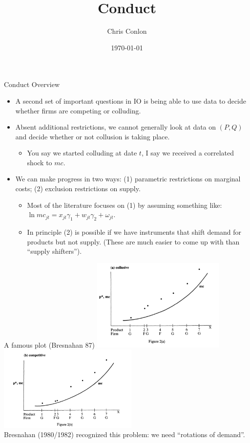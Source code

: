 \documentclass[xcolor=pdftex,dvipsnames,table,mathserif,aspectratio=169]{beamer}
\begin{document}
\title{Conduct}
\author{Chris Conlon}
\date{\today}

\frame{\titlepage}

\begin{frame}{Conduct Overview}
\begin{itemize}
\item A second set of important questions in IO is being able to use data to decide whether firms are \alert{competing} or \alert{colluding}.
\item Absent additional restrictions, we cannot generally look at data on $(P,Q)$ and decide whether or not collusion is taking place.
\begin{itemize}
\item You say we started colluding at date $t$, I say we received a correlated shock to $mc$.
\end{itemize}
\item We can make progress in two ways: (1) parametric restrictions on marginal costs; (2) exclusion restrictions on supply.
\begin{itemize}
\item Most of the literature focuses on (1) by assuming something like: $\ln mc_{jt} = x_{jt} \gamma_1 + w_{jt} \gamma_2 + \omega_{jt}$.
\item In principle (2) is possible if we have instruments that shift demand for products but not supply. (These are much easier to come up with than ``supply shifters'').
\end{itemize}
\end{itemize}
\end{frame}

\begin{frame}{A famous plot (Bresnahan 87)}
\includegraphics[width = 6.6cm]{./resources/bres_plot1.png}
\includegraphics[width = 6.9cm]{./resources/bres_plot2.png}\\
Bresnahan (1980/1982) recognized this problem: we need ``rotations of demand''.
\end{frame}
\end{document}
